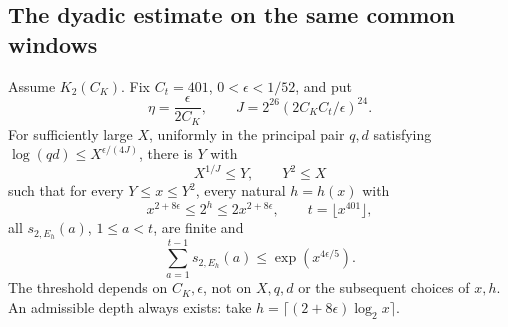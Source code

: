 \subsection{The dyadic estimate on the same common windows}
\begin{srtheorem}\label{thm:sr-dyadic-window}
Assume \(K_2(C_K)\).
Fix \(C_t=401\), \(0<\epsilon<1/52\), and put
\[
 \eta=\frac{\epsilon}{2C_K},\qquad
 J=2^{26}(2C_KC_t/\epsilon)^{24}.
\]
For sufficiently large \(X\), uniformly in the principal pair
\(q,d\) satisfying
\(\log(qd)\leq X^{\epsilon/(4J)}\), there is \(Y\) with
\[
 X^{1/J}\leq Y,\qquad Y^2\leq X
\]
such that for every \(Y\leq x\leq Y^2\), every natural \(h=h(x)\)
with
\[
 x^{2+8\epsilon}\leq2^h\leq2x^{2+8\epsilon},
                  \qquad t=\lfloor x^{401}\rfloor,
\]
all \(s_{2,E_h}(a)\), \(1\leq a<t\), are finite and
\begin{equation}\label{eq:sr-full-dyadic-window}
                \sum_{a=1}^{t-1}s_{2,E_h}(a)
                          \leq\exp(x^{4\epsilon/5}).
\end{equation}
The threshold depends on \(C_K,\epsilon\), not on \(X,q,d\)
or the subsequent choices of \(x,h\).
An admissible depth always exists: take
\(h=\lceil(2+8\epsilon)\log_2x\rceil\).
\end{srtheorem}
